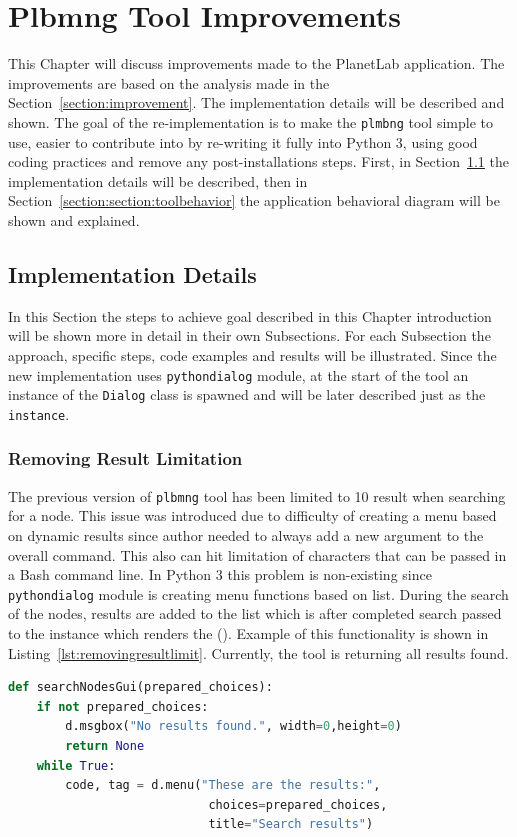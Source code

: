 \chapter{Plbmng Tool Improvements}
\label{chapter:improve}
This Chapter will discuss improvements made to the PlanetLab application. The improvements are based on the analysis made in the Section~\ref{section:improvement}. The implementation details will be described and shown. The goal of the re-implementation is to make the \texttt{plmbng} tool simple to use, easier to contribute into by re-writing it fully into Python 3, using good coding practices and remove any post-installations steps. First, in Section~\ref{section:implementapproach} the implementation details will be described, then in Section~\ref{section:section:toolbehavior} the application behavioral diagram will be shown and explained. 
\section{Implementation Details}
\label{section:implementapproach}
In this Section the steps to achieve goal described in this Chapter introduction will be shown more in detail in their own Subsections. For each Subsection the approach, specific steps, code examples and results will be illustrated. Since the new implementation uses \texttt{pythondialog} module, at the start of the tool an instance of the \texttt{Dialog} class is spawned and will be later described just as the \texttt{instance}.
\subsection{Removing Result Limitation}
The previous version of \texttt{plbmng} tool has been limited to 10 result when searching for a node. This issue was introduced due to difficulty of creating a menu based on dynamic results since author needed to always add a new argument to the overall command. This also can hit limitation of characters that can be passed in a Bash command line. In Python 3 this problem is non-existing since \texttt{pythondialog} module is creating menu functions based on list. During the search of the nodes, results are added to the list which is after completed search passed to the instance which renders the  (). Example of this functionality is shown in Listing~\ref{lst:removingresultlimit}. Currently, the tool is returning all results found.
\begin{lstlisting}[language=Python, numbers=none, label={lst:removingresultlimit}, caption=Removing Result Limitation, frame=single, showstringspaces=false]
def searchNodesGui(prepared_choices):
	if not prepared_choices:
		d.msgbox("No results found.", width=0,height=0)
		return None
	while True:
		code, tag = d.menu("These are the results:",
							choices=prepared_choices,
							title="Search results")
\end{lstlisting}
